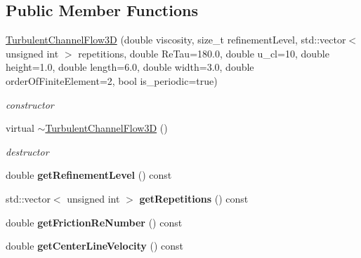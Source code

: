 \subsection*{Public Member Functions}
\begin{DoxyCompactItemize}
\item 
\hyperlink{classnatrium_1_1TurbulentChannelFlow3D_a5ffe8d8abb3209fffa0e96dc094e88fc}{TurbulentChannelFlow3D} (double viscosity, size\_\-t refinementLevel, std::vector$<$ unsigned int $>$ repetitions, double ReTau=180.0, double u\_\-cl=10, double height=1.0, double length=6.0, double width=3.0, double orderOfFiniteElement=2, bool is\_\-periodic=true)
\begin{DoxyCompactList}\small\item\em constructor \item\end{DoxyCompactList}\item 
\hypertarget{classnatrium_1_1TurbulentChannelFlow3D_ab64ee135c7156427f370b7d5225b5d99}{
virtual \hyperlink{classnatrium_1_1TurbulentChannelFlow3D_ab64ee135c7156427f370b7d5225b5d99}{$\sim$TurbulentChannelFlow3D} ()}
\label{classnatrium_1_1TurbulentChannelFlow3D_ab64ee135c7156427f370b7d5225b5d99}

\begin{DoxyCompactList}\small\item\em destructor \item\end{DoxyCompactList}\item 
\hypertarget{classnatrium_1_1TurbulentChannelFlow3D_a2ede3122bfa58fe49666d33115e55fd3}{
double {\bfseries getRefinementLevel} () const }
\label{classnatrium_1_1TurbulentChannelFlow3D_a2ede3122bfa58fe49666d33115e55fd3}

\item 
\hypertarget{classnatrium_1_1TurbulentChannelFlow3D_aec3b2a3852fd1f8987673f2ade97a921}{
std::vector$<$ unsigned int $>$ {\bfseries getRepetitions} () const }
\label{classnatrium_1_1TurbulentChannelFlow3D_aec3b2a3852fd1f8987673f2ade97a921}

\item 
\hypertarget{classnatrium_1_1TurbulentChannelFlow3D_aadc61bde5b2b11a0574983df00faabe2}{
double {\bfseries getFrictionReNumber} () const }
\label{classnatrium_1_1TurbulentChannelFlow3D_aadc61bde5b2b11a0574983df00faabe2}

\item 
\hypertarget{classnatrium_1_1TurbulentChannelFlow3D_a19919ff8e7f2b03bd74b7f3754a2d2b9}{
double {\bfseries getCenterLineVelocity} () const }
\label{classnatrium_1_1TurbulentChannelFlow3D_a19919ff8e7f2b03bd74b7f3754a2d2b9}


\end{DoxyCompactItemize}
